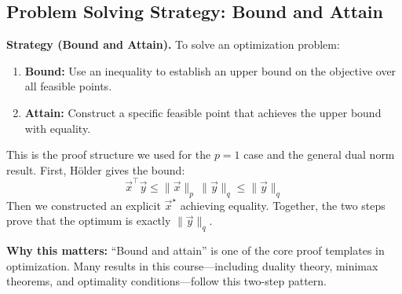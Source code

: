 \documentclass[10pt, twocolumn]{article}
\theoremstyle{definition}
\theoremstyle{plain}
\begin{document}
\subsection{Problem Solving Strategy: Bound and Attain}

\begin{tcolorbox}
\textbf{Strategy (Bound and Attain).} To solve an optimization problem:
\begin{enumerate}
    \item \textbf{Bound:} Use an inequality to establish an upper bound on the objective over all feasible points.
    \item \textbf{Attain:} Construct a specific feasible point that achieves the upper bound with equality.
\end{enumerate}
\end{tcolorbox}

This is the proof structure we used for the $p = 1$ case and the general dual norm result. First, H\"{o}lder gives the bound:
\[
    \vec{x}^\top \vec{y} \le \|\vec{x}\|_p \, \|\vec{y}\|_q \le \|\vec{y}\|_q
\]
Then we constructed an explicit $\vec{x}^\star$ achieving equality. Together, the two steps prove that the optimum is exactly $\|\vec{y}\|_q$.

\begin{tcolorbox}[colframe=black!50]
\textbf{Why this matters:} ``Bound and attain'' is one of the core proof templates in optimization. Many results in this course---including duality theory, minimax theorems, and optimality conditions---follow this two-step pattern.
\end{tcolorbox}

\begin{center}
\end{center}
\end{document}
